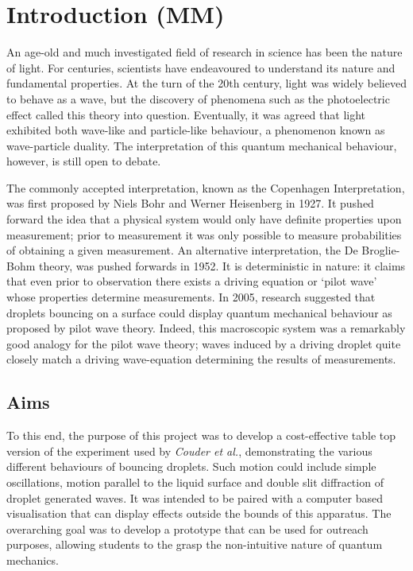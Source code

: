 \section{Introduction (MM)}
An age-old and much investigated field of research in science has been the nature of light. For centuries, scientists have endeavoured to understand its nature and fundamental properties. At the turn of the 20th century, light was widely believed to behave as a wave, but the discovery of phenomena such as the photoelectric effect called this theory into question. Eventually, it was agreed that light exhibited both wave-like and particle-like behaviour, a phenomenon known as wave-particle duality. The interpretation of this quantum mechanical behaviour, however, is still open to debate.

The commonly accepted interpretation, known as the Copenhagen Interpretation, was first proposed by Niels Bohr and Werner Heisenberg in 1927. It pushed forward the idea that a physical system would only have definite properties upon measurement; prior to measurement it was only possible to measure probabilities of obtaining a given measurement. An alternative interpretation, the De Broglie-Bohm theory, was pushed forwards in 1952. It is deterministic in nature: it claims that even prior to observation there exists a driving equation or `pilot wave' whose properties determine measurements. In 2005, research suggested \cite{couder} that droplets bouncing on a surface could display quantum mechanical behaviour as proposed by pilot wave theory. Indeed, this macroscopic system was a remarkably good analogy for the pilot wave theory; waves induced by a driving droplet quite closely match a driving wave-equation determining the results of measurements. 
\subsection{Aims}
To this end, the purpose of this project was to develop a cost-effective table top version of the experiment used by \textit{Couder et al.}, demonstrating the various different behaviours of bouncing droplets. Such motion could include simple oscillations, motion parallel to the liquid surface and double slit diffraction of droplet generated waves. It was intended to be paired with a computer based visualisation that can display effects outside the bounds of this apparatus. The overarching goal was to develop a prototype that can be used for outreach purposes, allowing  students to the grasp the non-intuitive nature of quantum mechanics. 

